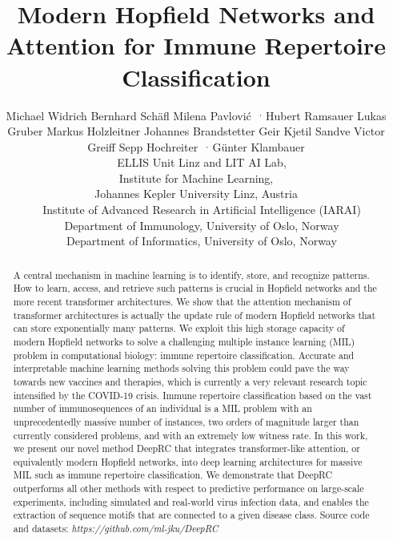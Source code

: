 \documentclass[oneside]{book}
\title{Modern Hopfield Networks and Attention for Immune Repertoire Classification}
\author{
    Michael Widrich\footnotemark[1] \And 
    Bernhard Sch\"{a}fl\footnotemark[1]  \And 
    Milena Pavlovi{\'c}\footnotemark[3]~$~^{,}$\footnotemark[4]\And 
    Hubert Ramsauer\footnotemark[1]  \And 
    Lukas Gruber\footnotemark[1]  \And  
    Markus Holzleitner\footnotemark[1]  \And  
    Johannes Brandstetter\footnotemark[1]  \And 
    Geir Kjetil Sandve\footnotemark[4]  \And 
    Victor Greiff\footnotemark[3] \And 
    Sepp Hochreiter\footnotemark[1]~$~^{,}$\footnotemark[2] \And 
    G\"{u}nter Klambauer\footnotemark[1]  \\
  \footnotemark[1]~~ELLIS Unit Linz and LIT AI Lab, \\ 
                    Institute for Machine Learning,\\
                    Johannes Kepler University Linz, Austria \\
  \footnotemark[2]~~Institute of Advanced Research in 
                    Artificial Intelligence (IARAI)\\
  \footnotemark[3]~~Department of Immunology, University of Oslo, Norway\\ 
  \footnotemark[4]~~Department of Informatics, University of Oslo, Norway
}
\begin{document}
%

%


\maketitle

\begin{abstract}
A central mechanism in machine learning is to identify, store, and recognize patterns.
How to learn, access, and retrieve such patterns is crucial in Hopfield networks and the more recent transformer architectures.
%
We show that the attention mechanism of transformer architectures is actually the update rule of
modern Hopfield networks that can store exponentially many patterns. 
We exploit this high storage capacity of modern Hopfield networks
to solve a challenging multiple instance learning (MIL)
problem in computational biology:
immune repertoire classification.  
Accurate and interpretable machine learning methods solving this problem
could pave the way towards new vaccines and therapies,
which is currently a very relevant
research topic intensified by the COVID-19 crisis.
Immune repertoire classification based on the vast number of 
immunosequences of an individual is a MIL problem with 
an unprecedentedly massive number of instances, two orders of magnitude larger than 
currently considered problems, and with an extremely low witness rate.
In this work, we present our novel method DeepRC that 
integrates transformer-like attention, or equivalently modern Hopfield networks,
into deep learning architectures for massive MIL such as immune repertoire classification. 
We demonstrate that DeepRC outperforms all other methods 
with respect to predictive performance on large-scale experiments,
including simulated and real-world virus infection data,
and enables the extraction of 
sequence motifs that are connected to a given disease class.
Source code and datasets: \textit{https://github.com/ml-jku/DeepRC}
\end{abstract}
%



\def\cheatspace{0mm} %

\vspace{\cheatspace}
\end{document}
